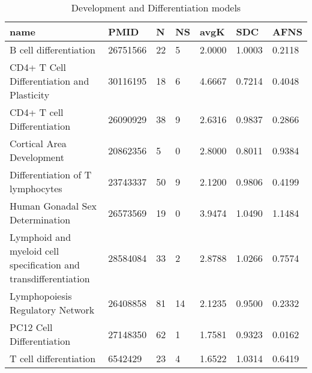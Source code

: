 \begin{table}
\centering
\caption{Development and Differentiation models}
\label{tab:Development_and_Differentiation}
\begin{tabular}{|p{180pt}||p{40pt}|p{25pt}|p{25pt}|p{40pt}|p{25pt}|p{25pt}|}
\toprule
name & PMID &N &NS & avgK &SDC & AFNS \\
\midrule
B cell differentiation & 26751566 & 22 & 5 & 2.0000 & 1.0003 & 0.2118 \\
CD4+ T Cell Differentiation and Plasticity & 30116195 & 18 & 6 & 4.6667 & 0.7214 & 0.4048 \\
CD4+ T cell Differentiation & 26090929 & 38 & 9 & 2.6316 & 0.9837 & 0.2866 \\
Cortical Area Development & 20862356 &5 & 0 & 2.8000 & 0.8011 & 0.9384 \\
Differentiation of T lymphocytes & 23743337 & 50 & 9 & 2.1200 & 0.9806 & 0.4199 \\
Human Gonadal Sex Determination & 26573569 & 19 & 0 & 3.9474 & 1.0490 & 1.1484 \\
Lymphoid and myeloid cell specification and transdifferentiation & 28584084 & 33 & 2 & 2.8788 & 1.0266 & 0.7574 \\
Lymphopoiesis Regulatory Network & 26408858 & 81 &14 & 2.1235 & 0.9500 & 0.2332 \\
PC12 Cell Differentiation & 27148350 & 62 & 1 & 1.7581 & 0.9323 & 0.0162 \\
T cell differentiation & 6542429 & 23 & 4 & 1.6522 & 1.0314 & 0.6419 \\
\bottomrule
\end{tabular}
\end{table}
